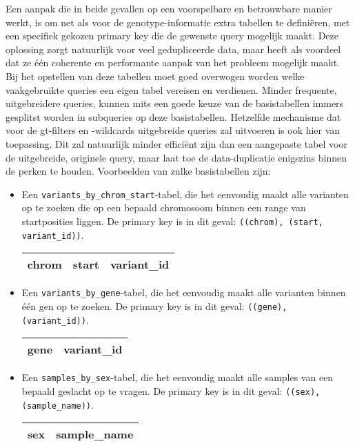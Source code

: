 Een aanpak die in beide gevallen op een voorspelbare en betrouwbare manier werkt, is om net als voor de genotype-informatie extra tabellen te defini\"eren, met een specifiek gekozen primary key die de gewenste query mogelijk maakt. Deze oplossing zorgt natuurlijk voor veel gedupliceerde data, maar heeft als voordeel dat ze \'e\'en coherente en performante aanpak van het probleem mogelijk maakt. Bij het opstellen van deze tabellen moet goed overwogen worden welke vaakgebruikte queries een eigen tabel vereisen en verdienen. Minder frequente, uitgebreidere queries, kunnen mits een goede keuze van de basistabellen immers gesplitst worden in subqueries op deze basistabellen. Hetzelfde mechanisme dat voor de gt-filters en -wildcards uitgebreide queries zal uitvoeren is ook hier van toepassing. Dit zal natuurlijk minder effici\"ent zijn dan een aangepaste tabel voor de uitgebreide, originele query, maar laat toe de data-duplicatie enigszins binnen de perken te houden. Voorbeelden van zulke basistabellen zijn:

\begin{itemize}
\item Een \texttt{variants\_by\_chrom\_start}-tabel, die het eenvoudig maakt alle varianten op te zoeken die op een bepaald chromosoom binnen een range van startposities liggen. De primary key is in dit geval: \texttt{((chrom), (start, variant\_id))}. 

\begin{table}[!htbp]
\begin{tabular}{@{}|l|l|l|@{}}
\toprule
\color{green} chrom & \color{red} start & \color{red} variant\_id \\ \bottomrule
\end{tabular}
\end{table}

\item Een \texttt{variants\_by\_gene}-tabel, die het eenvoudig maakt alle varianten binnen \'e\'en gen op te zoeken. De primary key is in dit geval: \texttt{((gene), (variant\_id))}.

\begin{table}[!htbp]
\begin{tabular}{@{}|l|l|@{}}
\toprule
\color{green} gene & \color{red} variant\_id \\ \bottomrule
\end{tabular}
\end{table}

\item Een \texttt{samples\_by\_sex}-tabel, die het eenvoudig maakt alle samples van een bepaald geslacht op te vragen. De primary key is in dit geval: \texttt{((sex), (sample\_name))}.

\begin{table}[!htbp]
\begin{tabular}{@{}|l|l|@{}}
\toprule
\color{green} sex & \color{red} sample\_name \\ \bottomrule
\end{tabular}
\end{table}
\end{itemize}

